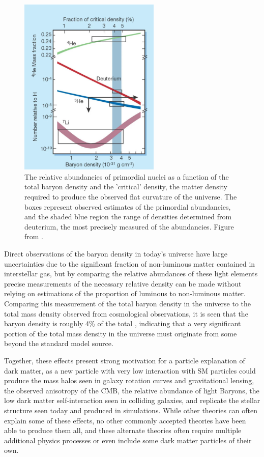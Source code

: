 \begin{figure}[htpb]
	\centering
	\includegraphics[width=0.6\textwidth]{figures/baryogenesis.png}
	\caption[Relative Light Baryon Abundancies]{The relative abundancies of primordial nuclei as a function of the total baryon density and the 'critical' density, the matter density required to produce the observed flat curvature of the universe. The boxes represent observed estimates of the primordial abundancies, and the shaded blue region the range of densities determined from deuterium, the most precisely measured of the abundancies. Figure from \cite{charbonnel2002}.
	\label{fig:baryogenesis}
	}
\end{figure}

Direct observations of the baryon density in today's universe have large uncertainties due to the significant fraction of non-luminous matter contained in interstellar gas, but by comparing the relative abundances of these light elements precise measurements of the necessary relative density can be made without relying on estimations of the proportion of luminous to non-luminous matter.
Comparing this measurement of the total baryon density in the universe to the total mass density observed from cosmological observations, it is seen that the baryon density is roughly 4\% of the total \cite{Tytler_2000}, indicating that a very significant portion of the total mass density in the universe must originate from some beyond the standard model source.

Together, these effects present strong motivation for a particle explanation of dark matter, as a new particle with very low interaction with SM particles could produce the mass halos seen in galaxy rotation curves and gravitational lensing, the observed anisotropy of the CMB, the relative abundance of light Baryons, the low dark matter self-interaction seen in colliding galaxies, and replicate the stellar structure seen today and produced in simulations.
While other theories can often explain some of these effects, no other commonly accepted theories have been able to produce them all, and these alternate theories often require multiple additional physics processes or even include some dark matter particles of their own.

